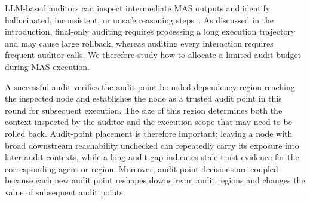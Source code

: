 \documentclass[letterpaper]{article} %
\begin{document}


LLM-based auditors can inspect intermediate MAS outputs and identify hallucinated, inconsistent, or unsafe reasoning
steps~\citep{zheng2023judgingllmasajudgemtbenchchatbot,
gu2025surveyllmasajudge}. As discussed in the introduction, final-only auditing requires processing a long execution trajectory and may cause large rollback, whereas auditing every interaction requires frequent auditor calls. We therefore study how to allocate a limited audit budget during MAS execution.

A successful audit verifies the audit point-bounded dependency
region reaching the inspected node and establishes the node as
a trusted audit point in this round for subsequent execution. The size of this
region determines both the context inspected by the auditor and
the execution scope that may need to be rolled back. Audit-point
placement is therefore important: leaving a node with broad
downstream reachability unchecked can repeatedly carry its
exposure into later audit contexts, while a long audit gap
indicates stale trust evidence for the corresponding agent or
region. Moreover, audit point decisions are coupled because each
new audit point reshapes downstream audit regions and changes the
value of subsequent audit points.
\end{document}
